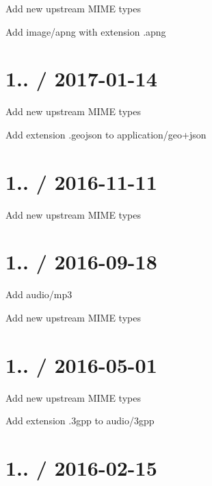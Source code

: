 \begin{DoxyItemize}
\item Add new upstream M\+I\+ME types
\item Add {\ttfamily image/apng} with extension {\ttfamily .apng}
\end{DoxyItemize}

\section*{1.. / 2017-\/01-\/14 }


\begin{DoxyItemize}
\item Add new upstream M\+I\+ME types
\item Add extension {\ttfamily .geojson} to {\ttfamily application/geo+json}
\end{DoxyItemize}

\section*{1.. / 2016-\/11-\/11 }


\begin{DoxyItemize}
\item Add new upstream M\+I\+ME types
\end{DoxyItemize}

\section*{1.. / 2016-\/09-\/18 }


\begin{DoxyItemize}
\item Add {\ttfamily audio/mp3}
\item Add new upstream M\+I\+ME types
\end{DoxyItemize}

\section*{1.. / 2016-\/05-\/01 }


\begin{DoxyItemize}
\item Add new upstream M\+I\+ME types
\item Add extension {\ttfamily .3gpp} to {\ttfamily audio/3gpp}
\end{DoxyItemize}

\section*{1.. / 2016-\/02-\/15 }



